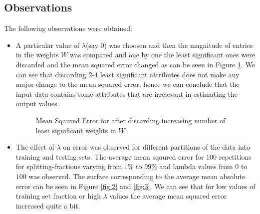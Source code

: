 \documentclass{article}
\begin{document}
\subsection*{Observations}
The following observations were obtained:
\begin{itemize}
\item A particular value of $\lambda$(say $0$) was choosen and then the magnitude of entries in the weights $W$ was compared and one by one the least significant ones were discarded and the mean squared error changed as can be seen in Figure \ref{fig:1}. We can see that discarding 2-4 least significant attributes does not make any major change to the mean squared error, hence we can conclude that the input data contains some attributes that are irrelevant in estimating the output values.

\begin{figure}[!h]
 \caption{Mean Sqaured Error for after discarding increasing number of least significant weights in $W$.}
 \label{fig:1}
 \end{figure}
 

\item The effect of $\lambda$ on error was observed for different partitions of the data into training and testing sets. The average mean sqaured error for 100 repetitions for splitting-fractions varying from $1\%$ to $99\%$ and lambda values from $0$ to $100$ was observed. The surface corresponding to the average mean absolute error can be seen in Figure \ref{fig:2} and \ref{fig:3}. We can see that for low values of training set fraction or high $\lambda$ values the average mean squared error increased quite a bit.


\end{itemize}
\end{document}

